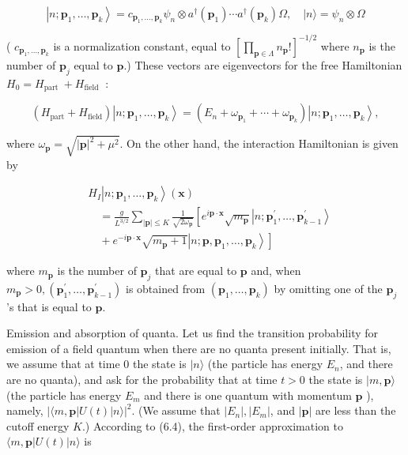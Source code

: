 \documentclass[10pt, letterpaper]{article}
\begin{document}
$$
\left|n ; \mathbf{p}_{1}, \ldots, \mathbf{p}_{k}\right\rangle=c_{\mathbf{p}_{1}, \ldots, \mathbf{p}_{k}} \psi_{n} \otimes a^{\dagger}\left(\mathbf{p}_{1}\right) \cdots a^{\dagger}\left(\mathbf{p}_{k}\right) \Omega, \quad|n\rangle=\psi_{n} \otimes \Omega
$$

( $c_{\mathbf{p}_{1}, \ldots, \mathbf{p}_{k}}$ is a normalization constant, equal to $\left[\prod_{\mathbf{p} \in \Lambda} n_{\mathbf{p}}!\right]^{-1 / 2}$ where $n_{\mathbf{p}}$ is the number of $\mathbf{p}_{j}$ equal to $\mathbf{p}$.) These vectors are eigenvectors for the free Hamiltonian $H_{0}=H_{\text {part }}+H_{\text {field }}$ :

$$
\left(H_{\mathrm{part}}+H_{\mathrm{field}}\right)\left|n ; \mathbf{p}_{1}, \ldots, \mathbf{p}_{k}\right\rangle=\left(E_{n}+\omega_{\mathbf{p}_{1}}+\cdots+\omega_{\mathbf{p}_{k}}\right)\left|n ; \mathbf{p}_{1}, \ldots, \mathbf{p}_{k}\right\rangle,
$$

where $\omega_{\mathbf{p}}=\sqrt{|\mathbf{p}|^{2}+\mu^{2}}$. On the other hand, the interaction Hamiltonian is given by

$$
\begin{aligned}
& H_{I}\left|n ; \mathbf{p}_{1}, \ldots, \mathbf{p}_{k}\right\rangle(\mathbf{x}) \\
& \quad=\frac{g}{L^{3 / 2}} \sum_{|\mathbf{p}| \leq K} \frac{1}{\sqrt{2 \omega_{\mathbf{p}}}}\left[e^{i \mathbf{p} \cdot \mathbf{x}} \sqrt{m_{\mathbf{p}}}\left|n ; \mathbf{p}_{1}^{\prime}, \ldots, \mathbf{p}_{k-1}^{\prime}\right\rangle\right. \\
& \left.\quad+e^{-i \mathbf{p} \cdot \mathbf{x}} \sqrt{m_{\mathbf{p}}+1}\left|n ; \mathbf{p}, \mathbf{p}_{1}, \ldots, \mathbf{p}_{k}\right\rangle\right]
\end{aligned}
$$

where $m_{\mathbf{p}}$ is the number of $\mathbf{p}_{j}$ that are equal to $\mathbf{p}$ and, when $m_{\mathbf{p}}>0,\left(\mathbf{p}_{1}^{\prime}, \ldots, \mathbf{p}_{k-1}^{\prime}\right)$ is obtained from $\left(\mathbf{p}_{1}, \ldots, \mathbf{p}_{k}\right)$ by omitting one of the $\mathbf{p}_{j}$ 's that is equal to $\mathbf{p}$.

Emission and absorption of quanta. Let us find the transition probability for emission of a field quantum when there are no quanta present initially. That is, we assume that at time 0 the state is $|n\rangle$ (the particle has energy $E_{n}$, and there are no quanta), and ask for the probability that at time $t>0$ the state is $|m, \mathbf{p}\rangle$ (the particle has energy $E_{m}$ and there is one quantum with momentum $\mathbf{p}$ ), namely, $|\langle m, \mathbf{p}| U(t)| n\rangle\left.\right|^{2}$. (We assume that $\left|E_{n}\right|,\left|E_{m}\right|$, and $|\mathbf{p}|$ are less than the cutoff energy $K$.) According to (6.4), the first-order approximation to $\langle m, \mathbf{p}| U(t)|n\rangle$ is
\end{document}
